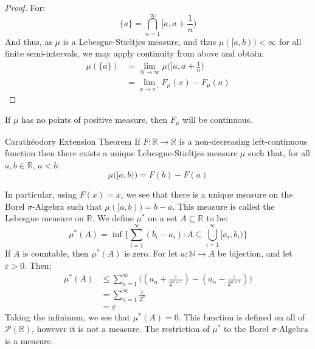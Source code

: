             \begin{proof}
                For:
                \begin{equation}
                    \{a\}=\bigcap_{n=1}^{\infty}[a,a+\frac{1}{n})
                \end{equation}
                And thus, as $\mu$ is a Lebesgue-Stieltjes measure,
                and thus $\mu([a,b))<\infty$ for all finite semi-intervals,
                we may apply continuity from above and obtain:
                \begin{align}
                    \mu(\{a\})&=
                    \underset{N\rightarrow\infty}{\lim}
                    \mu\big([a,a+\frac{1}{n}\big)\\
                    &=\underset{x\rightarrow{a}^{+}}{\lim}
                    F_{\mu}(x)-F_{\mu}(a)
                \end{align}
            \end{proof}
            If $\mu$ has no points of positive measure, then
            $F_{\mu}$ will be continuous.
            \begin{ftheorem}{Carath\'{e}odory Extension Theorem}{}
                If $F:\mathbb{R}\rightarrow\mathbb{R}$ is a non-decreasing
                left-continuous function then there exists a unique
                Lebesgue-Stieltjes measure $\mu$ such that, for all
                $a,b\in\mathbb{R}$, $a<b$:
                \begin{equation}
                    \mu\big([a,b)\big)=F(b)-F(a)
                \end{equation}
            \end{ftheorem}
            In particular, using $F(x)=x$, we see that there is a unique
            measure on the Borel $\sigma\text{-Algebra}$ such that
            $\mu([a,b))=b-a$. This measure is called the Lebesgue measure
            on $\mathbb{R}$. We define $\mu^{*}$ on a set
            $A\subseteq\mathbb{R}$ to be:
            \begin{equation}
                \mu^{*}(A)=
                \inf\Bigg\{\sum_{i=1}^{\infty}(b_{i}-a_{i}):
                A\subseteq\bigcup_{i=1}^{\infty}[a_{i},b_{i})\Bigg\}
            \end{equation}
            If $A$ is countable, then $\mu^{*}(A)$ is zero. For let
            $a:\mathbb{N}\rightarrow{A}$ be bijection, and let
            $\varepsilon>0$. Then:
            \begin{align}
                \mu^{*}(A)&\leq
                \sum_{n=1}^{\infty}
                \Big((a_{n}+\frac{\varepsilon}{2^{n+1}})-
                (a_{n}-\frac{\varepsilon}{2^{n+1}})\Big)\\
                &=\sum_{n=1}^{\infty}\frac{\varepsilon}{2^{n}}\\
                &=\varepsilon
            \end{align}
            Taking the infininum, we see that $\mu^{*}(A)=0$. This
            function is defined on all of $\mathcal{P}(\mathbb{R})$,
            however it is not a measure. The restriction of
            $\mu^{*}$ to the Borel $\sigma\text{-Algebra}$ is
            a measure.
